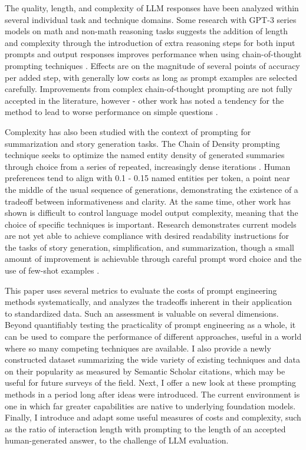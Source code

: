 \documentclass[11pt]{article}
\begin{document}
The quality, length, and complexity of LLM responses have been analyzed within several individual task and technique domains. Some research with GPT-3 series models on math and non-math reasoning tasks suggests the addition of length and complexity through the introduction of extra reasoning steps for both input prompts and output responses improves performance when using chain-of-thought prompting techniques \cite{fu_complexity-based_2023}. Effects are on the magnitude of several points of accuracy per added step, with generally low costs as long as prompt examples are selected carefully. Improvements from complex chain-of-thought prompting are not fully accepted in the literature, however - other work has noted a tendency for the method to lead to worse performance on simple questions \cite{shum_automatic_2023}.

Complexity has also been studied with the context of prompting for summarization and story generation tasks. The Chain of Density prompting technique seeks to optimize the named entity density of generated summaries through choice from a series of repeated, increasingly dense iterations \cite{adams_sparse_2023}. Human preferences tend to align with 0.1 - 0.15 named entities per token, a point near the middle of the usual sequence of generations, demonstrating the existence of a tradeoff between informativeness and clarity. At the same time, other work has shown is difficult to control language model output complexity, meaning that the choice of specific techniques is important. Research demonstrates current models are not yet able to achieve compliance with desired readability instructions for the tasks of story generation, simplification, and summarization, though a small amount of improvement is achievable through careful prompt word choice and the use of few-shot examples \cite{pu_chatgpt_2023, imperial_flesch_2023}.

This paper uses several metrics to evaluate the costs of prompt engineering methods systematically, and analyzes the tradeoffs inherent in their application to standardized data. Such an assessment is valuable on several dimensions. Beyond quantifiably testing the practicality of prompt engineering as a whole, it can be used to compare the performance of different approaches, useful in a world where so many competing techniques are available. I also provide a newly constructed dataset summarizing the wide variety of existing techniques and data on their popularity as measured by Semantic Scholar citations, which may be useful for future surveys of the field. Next, I offer a new look at these prompting methods in a period long after ideas were introduced. The current environment is one in which far greater capabilities are native to underlying foundation models. Finally, I introduce and adapt some useful measures of costs and complexity, such as the ratio of interaction length with prompting to the length of an accepted human-generated answer, to the challenge of LLM evaluation.
\end{document}
